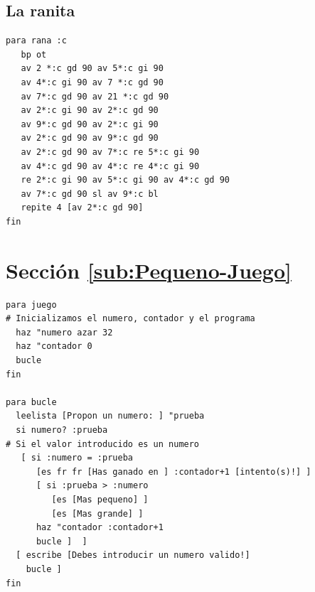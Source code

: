 \documentclass[12pt,twoside,spanish,a4paper]{report}
\begin{document}
\subsection{La ranita}

\begin{verbatim}
para rana :c
   bp ot
   av 2 *:c gd 90 av 5*:c gi 90
   av 4*:c gi 90 av 7 *:c gd 90
   av 7*:c gd 90 av 21 *:c gd 90
   av 2*:c gi 90 av 2*:c gd 90
   av 9*:c gd 90 av 2*:c gi 90
   av 2*:c gd 90 av 9*:c gd 90
   av 2*:c gd 90 av 7*:c re 5*:c gi 90
   av 4*:c gd 90 av 4*:c re 4*:c gi 90
   re 2*:c gi 90 av 5*:c gi 90 av 4*:c gd 90
   av 7*:c gd 90 sl av 9*:c bl
   repite 4 [av 2*:c gd 90]
fin \end{verbatim}

\section{Secci\'on \ref{sub:Pequeno-Juego}}

\begin{verbatim}
para juego
# Inicializamos el numero, contador y el programa
  haz "numero azar 32
  haz "contador 0
  bucle
fin

para bucle
  leelista [Propon un numero: ] "prueba
  si numero? :prueba
# Si el valor introducido es un numero
   [ si :numero = :prueba
      [es fr fr [Has ganado en ] :contador+1 [intento(s)!] ]
      [ si :prueba > :numero
         [es [Mas pequeno] ]
         [es [Mas grande] ]
      haz "contador :contador+1
      bucle ]  ]
  [ escribe [Debes introducir un numero valido!]
    bucle ]
fin \end{verbatim}
\end{document}
